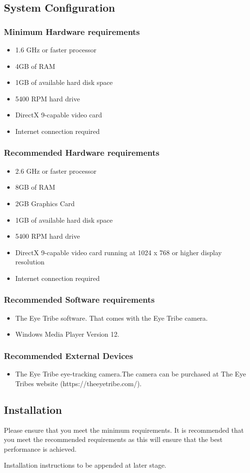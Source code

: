 \subsection{System Configuration}
\subsubsection{Minimum Hardware requirements}
\begin{itemize}
\item 1.6 GHz or faster processor
\item 4GB of RAM
\item 1GB of available hard disk space
\item 5400 RPM hard drive
\item DirectX 9-capable video card
\item Internet connection required
\end{itemize}

\subsubsection{Recommended Hardware requirements}
\begin{itemize}
\item 2.6 GHz or faster processor
\item 8GB of RAM
\item 2GB Graphics Card
\item 1GB of available hard disk space
\item 5400 RPM hard drive
\item DirectX 9-capable video card running at 1024 x 768 or higher display resolution
\item Internet connection required
\end{itemize}

\subsubsection{Recommended Software requirements}
\begin{itemize}
\item The Eye Tribe software. That comes with the Eye Tribe camera.
\item Windows Media Player Version 12.
\end{itemize}

\subsubsection{Recommended External Devices}
\begin{itemize}
\item The Eye Tribe eye-tracking camera.The camera can be purchased at The Eye Tribes website (https://theeyetribe.com/).
\end{itemize}




\subsection{Installation}
Please ensure that you meet the minimum requirements. It is recommended that you meet the recommended requirements as this will ensure that the best performance is achieved.

Installation instructions to be appended at later stage.